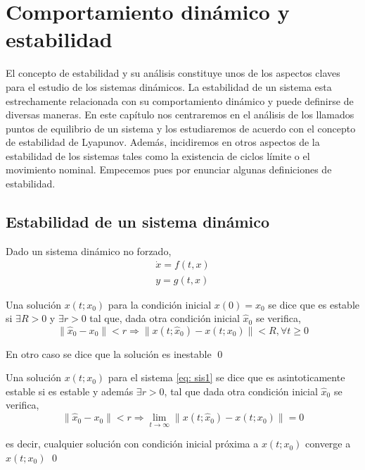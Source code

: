 \chapter{Comportamiento dinámico y estabilidad}
El concepto de estabilidad y su análisis constituye unos de los aspectos claves para el estudio de los sistemas dinámicos. La estabilidad de un sistema esta estrechamente relacionada con su comportamiento dinámico y puede definirse de diversas maneras. En este capítulo nos centraremos en el análisis de los llamados puntos de equilibrio de un sistema y los estudiaremos de acuerdo con el concepto de estabilidad de Lyapunov. Además, incidiremos en otros aspectos de la estabilidad de los sistemas tales como la existencia de ciclos límite o el movimiento nominal. Empecemos pues por enunciar algunas definiciones de estabilidad.



\section{Estabilidad de un sistema dinámico}
Dado un sistema dinámico no forzado,
\begin{align}
\dot{x} = f(t,x) \label{eq: sis1}\\
y = g(t,x)
\end{align}

\begin{definition}
Una solución $x(t;x_0)$ para la condición inicial $x(0) = x_0$ se dice que es estable si  $\exists R>0$ y  $ \exists r>0$ tal que, dada otra condición inicial $\hat x_0$ se verifica,
\begin{equation}
\|\hat x_0-x_0\|<r \Rightarrow \|x(t;\hat x_0) - x(t;x_0)\|<R, \forall t \geq 0
\end{equation}

En otro caso se dice que la solución es inestable 
\qed
\end{definition}

\begin{definition}
Una solución $x(t;x_0)$ para el sistema \ref{eq: sis1} se dice que es asintoticamente estable si es estable y además  $\exists r>0$, tal que dada otra condición inicial $\hat x_0$ se verifica,
\begin{equation}
\|\hat x_0-x_0\|<r \Rightarrow \lim_{t \to \infty}\|x(t;\hat x_0) - x(t;x_0)\|=0
\end{equation}

es decir, cualquier solución con condición inicial próxima  a $x(t;x_0)$ converge a $x(t;x_0)$
\qed
\end{definition}

